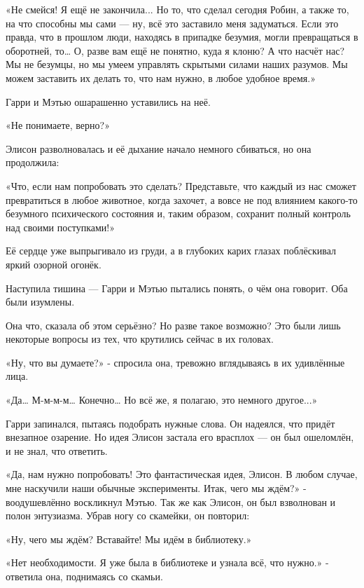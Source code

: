 \documentclass[a4paper,12pt]{book}
\begin{document}
\par
«Не смейся! Я ещё не закончила... Но то, что сделал сегодня Робин, а также то, на что способны мы сами — ну, всё это заставило меня задуматься. Если это правда, что в прошлом люди, находясь в припадке безумия, могли превращаться в оборотней, то… О, разве вам ещё не понятно, куда я клоню? А что насчёт нас? Мы не безумцы, но мы умеем управлять скрытыми силами наших разумов. Мы можем заставить их делать то, что нам нужно, в любое удобное время.»
\par
Гарри и Мэтью ошарашенно уставились на неё.
\par
«Не понимаете, верно?»
\par
Элисон разволновалась и её дыхание начало немного сбиваться, но она продолжила:
\par
«Что, если нам попробовать это сделать? Представьте, что каждый из нас сможет превратиться в любое животное, когда захочет, а вовсе не под влиянием какого-то безумного психического состояния и, таким образом, сохранит полный контроль над своими поступками!»\\
\par
Её сердце уже выпрыгивало из груди, а в глубоких карих глазах поблёскивал яркий озорной огонёк.
\par
Наступила тишина — Гарри и Мэтью пытались понять, о чём она говорит. Оба были изумлены.
\par
Она что, сказала об этом серьёзно? Но разве такое возможно? Это были лишь некоторые вопросы из тех, что крутились сейчас в их головах.
\par
«Ну, что вы думаете?» - спросила она, тревожно вглядываясь в их удивлённые лица.
\par
«Да… М-м-м-м… Конечно… Но всё же, я полагаю, это немного другое...»
\par
Гарри запинался, пытаясь подобрать нужные слова. Он надеялся, что придёт внезапное озарение. Но идея Элисон застала его врасплох — он был ошеломлён, и не знал, что ответить.
\par
«Да, нам нужно попробовать! Это фантастическая идея, Элисон. В любом случае, мне наскучили наши обычные эксперименты. Итак, чего мы ждём?» - воодушевлённо воскликнул Мэтью. Так же как Элисон, он был взволнован и полон энтузиазма. Убрав ногу со скамейки, он повторил:
\par
«Ну, чего мы ждём? Вставайте! Мы идём в библиотеку.»
\par
«Нет необходимости. Я уже была в библиотеке и узнала всё, что нужно.» - ответила она, поднимаясь со скамьи.
\par
\end{document}
